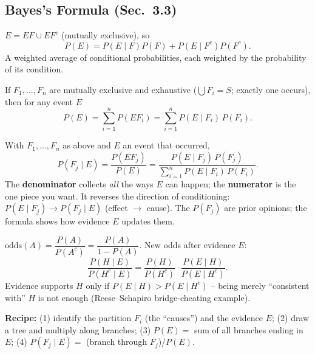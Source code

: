 \documentclass[11pt]{article}
\let\oldsubsection\subsection
\renewcommand{\subsection}{\Needspace{14\baselineskip}\oldsubsection}
\begin{document}
\subsection{Bayes's Formula (Sec.\ 3.3)}

\begin{thmbox}
$E=EF\cup EF^c$ (mutually exclusive), so
\[ P(E)=P(E\mid F)P(F)+P(E\mid F^c)P(F^c). \]
A weighted average of conditional probabilities, each weighted by the probability of its condition.
\end{thmbox}

\begin{thmbox}
If $F_1,\dots,F_n$ are mutually exclusive and exhaustive ($\bigcup F_i=S$; exactly one occurs), then for any event $E$
\[ P(E)=\sum_{i=1}^nP(EF_i)=\sum_{i=1}^nP(E\mid F_i)\,P(F_i). \]
\end{thmbox}

\begin{thmbox}
With $F_1,\dots,F_n$ as above and $E$ an event that occurred,
\[ P(F_j\mid E)=\frac{P(EF_j)}{P(E)}=\frac{P(E\mid F_j)\,P(F_j)}{\displaystyle\sum_{i=1}^nP(E\mid F_i)\,P(F_i)}. \]
The \textbf{denominator} collects \emph{all} the ways $E$ can happen; the \textbf{numerator} is the one piece you want. It reverses the direction of conditioning: $P(E\mid F_j)\to P(F_j\mid E)$ (effect $\to$ cause). The $P(F_j)$ are prior opinions; the formula shows how evidence $E$ updates them.
\end{thmbox}

\begin{defbox}
$\text{odds}(A)=\dfrac{P(A)}{P(A^c)}=\dfrac{P(A)}{1-P(A)}$. New odds after evidence $E$:
\[ \frac{P(H\mid E)}{P(H^c\mid E)}=\frac{P(H)}{P(H^c)}\cdot\frac{P(E\mid H)}{P(E\mid H^c)}. \]
Evidence supports $H$ only if $P(E\mid H)>P(E\mid H^c)$ -- being merely ``consistent with'' $H$ is not enough (Reese--Schapiro bridge-cheating example).
\end{defbox}

\textbf{Recipe:} (1) identify the partition $F_i$ (the ``causes'') and the evidence $E$; (2) draw a tree and multiply along branches; (3) $P(E)=$ sum of all branches ending in $E$; (4) $P(F_j\mid E)=$ (branch through $F_j$)/$P(E)$.
\end{document}
